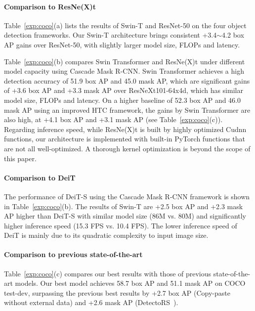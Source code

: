 \documentclass[10pt,twocolumn,letterpaper]{article}
\begin{document}
\paragraph{Comparison to ResNe(X)t} Table~\ref{exp:coco}(a) lists the results of Swin-T and ResNet-50 on the four object detection frameworks. Our Swin-T architecture brings consistent +3.4$\sim$4.2 box AP gains over ResNet-50, with slightly larger model size, FLOPs and latency. 

Table~\ref{exp:coco}(b) compares Swin Transformer and ResNe(X)t under different model capacity using Cascade Mask R-CNN. Swin Transformer achieves a high detection accuracy of 51.9 box AP and 45.0 mask AP, which are significant gains of +3.6 box AP and +3.3 mask AP over ResNeXt101-64x4d, which has similar model size, FLOPs and latency. On a higher baseline of 52.3 box AP and 46.0 mask AP using an improved HTC framework, the gains by Swin Transformer are also high, at +4.1 box AP and +3.1 mask AP (see Table~\ref{exp:coco}(c)). Regarding inference speed, while ResNe(X)t is built by highly optimized Cudnn functions, our architecture is implemented with built-in PyTorch functions that are not all well-optimized. A thorough kernel optimization is beyond the scope of this paper.

\paragraph{Comparison to DeiT} The performance of DeiT-S using the Cascade Mask R-CNN framework is shown in Table~\ref{exp:coco}(b). The results of Swin-T are +2.5 box AP and +2.3 mask AP higher than DeiT-S with similar model size (86M vs. 80M) and significantly higher inference speed (15.3 FPS vs. 10.4 FPS). The lower inference speed of DeiT is mainly due to its quadratic complexity to input image size.

\paragraph{Comparison to previous state-of-the-art} Table~\ref{exp:coco}(c) compares our best results with those of previous state-of-the-art models. Our best model achieves 58.7 box AP and 51.1 mask AP on COCO test-dev, surpassing the previous best results by +2.7 box AP (Copy-paste~\cite{ghiasi2020copy} without external data) and +2.6 mask AP (DetectoRS~\cite{qiao2020detectors}). 
\end{document}
